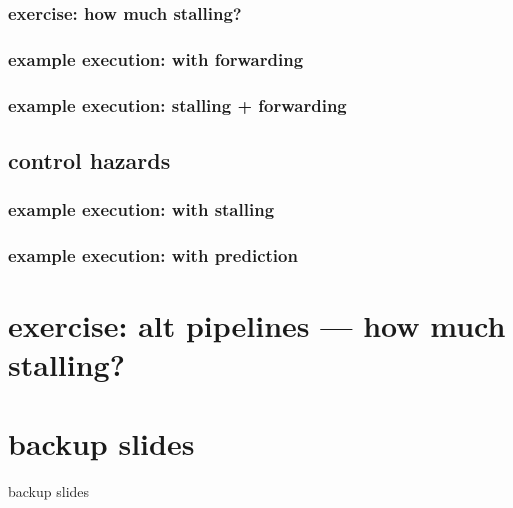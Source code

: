 \subsubsection{exercise: how much stalling?}

\subsubsection{example execution: with forwarding}

\subsubsection{example execution: stalling + forwarding}

\subsection{control hazards}

\subsubsection{example execution: with stalling}

\subsubsection{example execution: with prediction}

\section{exercise: alt pipelines --- how much stalling?}


\section{backup slides}
\begin{frame}{backup slides}
\end{frame}


